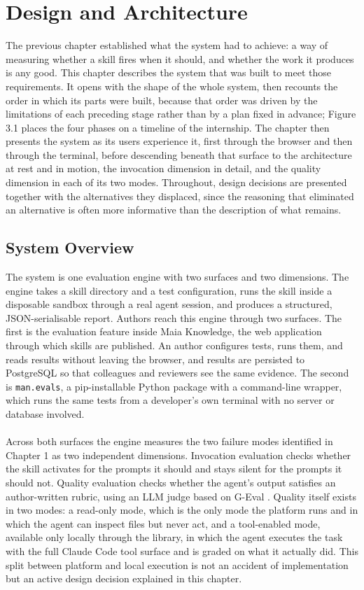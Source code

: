 \chapter{Design and Architecture}
The previous chapter established what the system had to achieve: a way of measuring whether a skill fires when it should, and whether the work it produces is any good. This chapter describes the system that was built to meet those requirements. It opens with the shape of the whole system, then recounts the order in which its parts were built, because that order was driven by the limitations of each preceding stage rather than by a plan fixed in advance; Figure 3.1 places the four phases on a timeline of the internship. The chapter then presents the system as its users experience it, first through the browser and then through the terminal, before descending beneath that surface to the architecture at rest and in motion, the invocation dimension in detail, and the quality dimension in each of its two modes. Throughout, design decisions are presented together with the alternatives they displaced, since the reasoning that eliminated an alternative is often more informative than the description of what remains.

\section{System Overview}
The system is one evaluation engine with two surfaces and two dimensions. The engine takes a skill directory and a test configuration, runs the skill inside a disposable sandbox through a real agent session, and produces a structured, JSON-serialisable report. Authors reach this engine through two surfaces. The first is the evaluation feature inside Maia Knowledge, the web application through which skills are published. An author configures tests, runs them, and reads results without leaving the browser, and results are persisted to PostgreSQL so that colleagues and reviewers see the same evidence. The second is \texttt{man.evals}, a pip-installable Python package with a command-line wrapper, which runs the same tests from a developer's own terminal with no server or database involved.
\\\\
Across both surfaces the engine measures the two failure modes identified in Chapter 1 as two independent dimensions. Invocation evaluation checks whether the skill activates for the prompts it should and stays silent for the prompts it should not. Quality evaluation checks whether the agent's output satisfies an author-written rubric, using an LLM judge based on G-Eval \cite{liu2023geval}. Quality itself exists in two modes: a read-only mode, which is the only mode the platform runs and in which the agent can inspect files but never act, and a tool-enabled mode, available only locally through the library, in which the agent executes the task with the full Claude Code tool surface and is graded on what it actually did. This split between platform and local execution is not an accident of implementation but an active design decision explained in this chapter.

